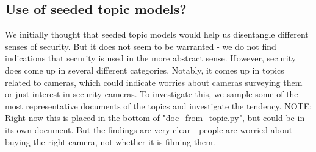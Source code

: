 \documentclass{article}
\begin{document}
    \subsection{Use of seeded topic models?}
        We initially thought that seeded topic models would help us disentangle different senses of security. But it does not seem to be warranted - we do not find indications that security is used in the more abstract sense. However, security does come up in several different categories. Notably, it comes up in topics related to cameras, which could indicate worries about cameras surveying them or just interest in security cameras. To investigate this, we sample some of the most representative documents of the topics and investigate the tendency. NOTE: Right now this is placed in the bottom of "doc\_from\_topic.py", but could be in its own document. But the findings are very clear - people are worried about buying the right camera, not whether it is filming them. 
\end{document}
